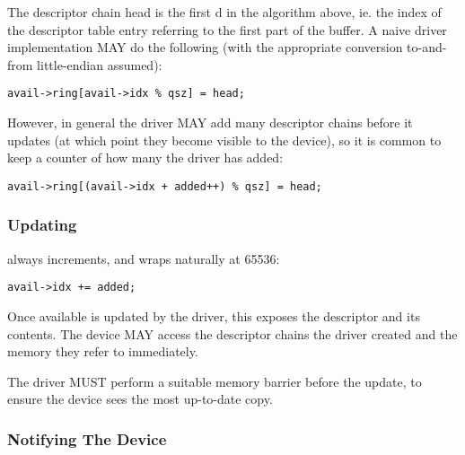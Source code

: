 The descriptor chain head is the first d in the algorithm
above, ie. the index of the descriptor table entry referring to the first
part of the buffer.  A naive driver implementation MAY do the following (with the
appropriate conversion to-and-from little-endian assumed):

\begin{lstlisting}
avail->ring[avail->idx % qsz] = head;
\end{lstlisting}

However, in general the driver MAY add many descriptor chains before it updates
 (at which point they become visible to the
device), so it is common to keep a counter of how many the driver has added:

\begin{lstlisting}
avail->ring[(avail->idx + added++) % qsz] = head;
\end{lstlisting}

\subsubsection{Updating }\label{sec:Basic Facilities of a Virtio Device / Virtqueues / Supplying Buffers to The Device / Updating idx}

 always increments, and wraps naturally at
65536:

\begin{lstlisting}
avail->idx += added;
\end{lstlisting}

Once available  is updated by the driver, this exposes the
descriptor and its contents.  The device MAY
access the descriptor chains the driver created and the
memory they refer to immediately.

The driver MUST perform a suitable memory barrier before the  update, to ensure the
device sees the most up-to-date copy.

\subsubsection{Notifying The Device}\label{sec:Basic Facilities of a Virtio Device / Virtqueues / Supplying Buffers to The Device / Notifying The Device}

